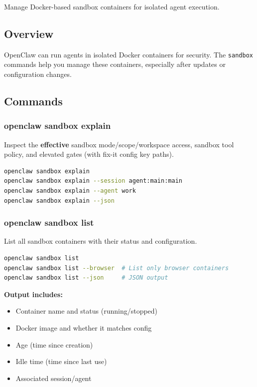 Manage Docker-based sandbox containers for isolated agent execution.

\subsection{Overview}


OpenClaw can run agents in isolated Docker containers for security. The \texttt{sandbox} commands help you manage these containers, especially after updates or configuration changes.

\subsection{Commands}


\subsubsection{openclaw sandbox explain}


Inspect the \textbf{effective} sandbox mode/scope/workspace access, sandbox tool policy, and elevated gates (with fix-it config key paths).

\begin{lstlisting}[language=bash]
openclaw sandbox explain
openclaw sandbox explain --session agent:main:main
openclaw sandbox explain --agent work
openclaw sandbox explain --json
\end{lstlisting}


\subsubsection{openclaw sandbox list}


List all sandbox containers with their status and configuration.

\begin{lstlisting}[language=bash]
openclaw sandbox list
openclaw sandbox list --browser  # List only browser containers
openclaw sandbox list --json     # JSON output
\end{lstlisting}


\textbf{Output includes:}

\begin{itemize}
  \item Container name and status (running/stopped)
  \item Docker image and whether it matches config
  \item Age (time since creation)
  \item Idle time (time since last use)
  \item Associated session/agent
\end{itemize}


